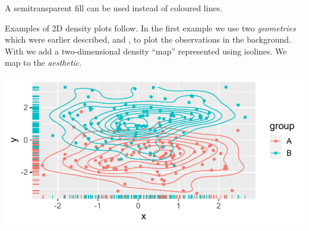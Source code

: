 \documentclass[krantz2]{krantz}\usepackage{knitr}
\begin{document}
A semitransparent fill can be used instead of coloured lines.

\begin{knitrout}\footnotesize
{}\color{fgcolor}\begin{kframe}
\begin{alltt}
    \hlopt{+}
  \hlstd{(} \hlstd{=} \hlstd{)}
\end{alltt}
\end{kframe}
\end{knitrout}


Examples of 2D density plots follow. In the first example we use two \emph{geometries} which were earlier described,  and , to plot the observations in the background. With  we add a two-dimensional density ``map'' represented using isolines. We map  to the  \emph{aesthetic}.

\begin{knitrout}\footnotesize
{}\color{fgcolor}\begin{kframe}
\begin{alltt}
    \hlopt{+}
  \hlstd{()} \hlopt{+}
  \hlstd{()} \hlopt{+}
  \hlstd{()}
\end{alltt}
\end{kframe}

{\centering \includegraphics[width=.7\textwidth]{figure/pos-density-plot-10-1} 

}



\end{knitrout}
\end{document}
